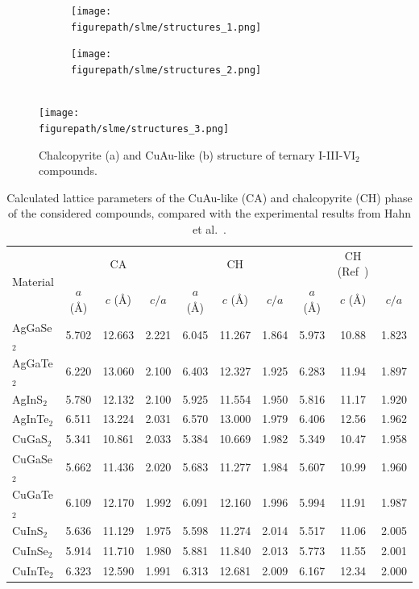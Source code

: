 \begin{refsection}
\begin{figure}[ht]  
\setlength{\captionmargin}{10pt} 
\centering 
\begin{subfigure}{0.24\textwidth} 
\centering 
\texttt{[image: \\figurepath/slme/structures\_1.png]} 
\caption{} 
\end{subfigure}%
\begin{subfigure}{0.24\textwidth} 
\centering 
\texttt{[image: \\figurepath/slme/structures\_2.png]} 
\caption{} 
\end{subfigure} 
\vspace{0.7em}\\ 
\texttt{[image: \\figurepath/slme/structures\_3.png]} 
\caption{\label{slme:fig-CuAu_structure} Chalcopyrite (a) and CuAu-like (b) 
structure of ternary \mbox{I-III-VI$_2$} compounds.} 
\end{figure} 
 
\begin{table}[ht] 
\centering 
\renewcommand{\arraystretch}{1.2} 
\caption{Calculated lattice parameters of the \mbox{CuAu-like} (CA) and chalcopyrite (CH) 
phase of the considered compounds, compared with the experimental results from Hahn et al.~\cite{Hahn1953}.} 
\label{slme:tab-lattice} 
\begin{tabular*}{\textwidth}{@{\extracolsep{\fill}}lccccccccc}\hline 
\multirow{2}{*}{Material}    & & CA & & & CH & & & CH (Ref~\cite{Hahn1953}) & 
\\ \cmidrule(lr){2-4} \cmidrule(lr){5-7} \cmidrule(lr){8-10} 
 			&  $a$ (\si{\angstrom}) & $c$ (\si{\angstrom}) & $c/a$ & $a$ 
(\si{\angstrom}) & $c$ (\si{\angstrom}) & $c/a$ & $a$ (\si{\angstrom}) & $c$ 
(\si{\angstrom}) & $c/a$ \\\hline 
AgGaSe$_2$ 	& 5.702 & 12.663 & 2.221 & 6.045 & 11.267 & 1.864 & 5.973 & 10.88 
& 1.823 \\ 
AgGaTe$_2$ 	& 6.220 & 13.060 & 2.100 & 6.403 & 12.327 & 1.925 & 6.283 & 11.94 
& 1.897 \\ 
AgInS$_2$  	& 5.780 & 12.132 & 2.100 & 5.925 & 11.554 & 1.950 & 5.816 & 11.17 
& 1.920 \\ 
AgInTe$_2$ 	& 6.511 & 13.224 & 2.031 & 6.570 & 13.000 & 1.979 & 6.406 & 12.56 
& 1.962 \\ 
CuGaS$_2$  	& 5.341 & 10.861 & 2.033 & 5.384 & 10.669 & 1.982 & 5.349 & 10.47 
& 1.958 \\ 
CuGaSe$_2$ 	& 5.662 & 11.436 & 2.020 & 5.683 & 11.277 & 1.984 & 5.607 & 10.99 
& 1.960 \\ 
CuGaTe$_2$ 	& 6.109 & 12.170 & 1.992 & 6.091 & 12.160 & 1.996 & 5.994 & 11.91 
& 1.987 \\ 
CuInS$_2$ 	& 5.636 & 11.129 & 1.975 & 5.598 & 11.274 & 2.014 & 5.517 & 11.06 & 
2.005 \\ 
CuInSe$_2$ 	& 5.914 & 11.710 & 1.980 & 5.881 & 11.840 & 2.013 & 5.773 & 11.55 
& 2.001 \\ 
CuInTe$_2$ 	& 6.323 & 12.590 & 1.991 & 6.313 & 12.681 & 2.009 & 6.167 & 12.34 
& 2.000 \\ \hline 
\end{tabular*} 
\end{table} 


\end{refsection}
